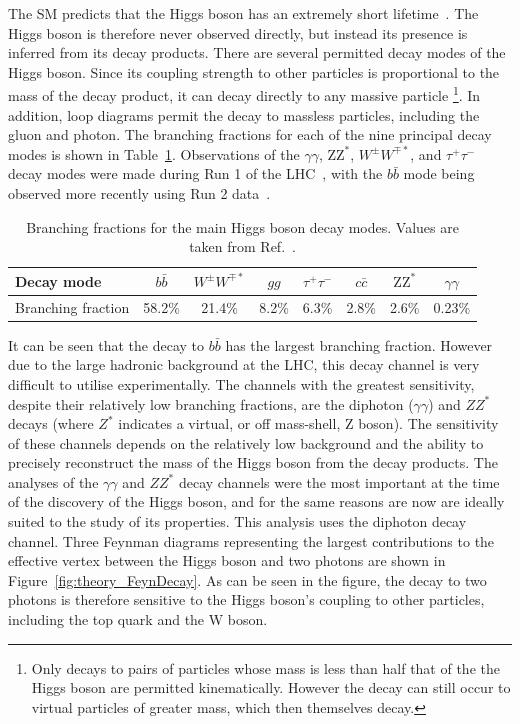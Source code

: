 The SM predicts that the Higgs boson has an extremely short lifetime~\cite{YR4}.
The Higgs boson is therefore never observed directly, 
but instead its presence is inferred from its decay products.
There are several permitted decay modes of the Higgs boson.
Since its coupling strength to other particles is proportional to the mass of the decay product, 
it can decay directly to any massive particle
\footnote{Only decays to pairs of particles whose mass is less than half that of the the Higgs boson
are permitted kinematically. 
However the decay can still occur to virtual particles of greater mass, 
which then themselves decay.}.
In addition, loop diagrams permit the decay to massless particles, including the gluon and photon.
The branching fractions for each of the nine principal decay modes 
is shown in Table~\ref{tab:theory_decay}.
Observations of the $\gamma\gamma$, $\mathrm{ZZ}^{*}$, $W^{\pm}W^{\mp*}$, 
and $\tau^+\tau^-$ decay modes were made during Run 1 
of the LHC~\cite{ATLAScouplingsRun1,CMScouplingsRun1,ATLASandCMScouplingsRun1}, 
with the $b\bar{b}$ mode being observed more recently 
using Run 2 data~\cite{ATLAStautauObservation,CMStautauObservation,ATLASbbObservation,CMSbbObservation}.

\begin{table}
  \centering
  \begin{tabular}{ l | c c c c c c c }
      \hline
      Decay mode & $b\bar{b}$ & $W^{\pm}W^{\mp*}$ & $gg$ & $\tau^+\tau^-$ & $c\bar{c}$ & $\mathrm{ZZ}^{*}$ & $\gamma\gamma$ \\
      \hline
      Branching fraction & 58.2\% & 21.4\% & 8.2\% & 6.3\% & 2.8\% & 2.6\% & 0.23\% \\
      \hline
  \end{tabular}%
  \caption{
  Branching fractions for the main Higgs boson decay modes. 
  Values are taken from Ref.~\cite{YR4}.
  }
  \label{tab:theory_decay}
\end{table}

It can be seen that the decay to $b\bar{b}$ has the largest branching fraction.
However due to the large hadronic background at the LHC, 
this decay channel is very difficult to utilise experimentally.
The channels with the greatest sensitivity, despite their relatively low branching fractions, 
are the diphoton ($\gamma\gamma$) and $ZZ^{*}$ decays 
(where $Z^{*}$ indicates a virtual, or off mass-shell, Z boson).
The sensitivity of these channels depends on the relatively low background 
and the ability to precisely reconstruct the mass of the Higgs boson from the decay products.
The analyses of the $\gamma\gamma$ and $ZZ^{*}$ decay channels were the most important 
at the time of the discovery of the Higgs boson, 
and for the same reasons are now are ideally suited to the study of its properties.
This analysis uses the diphoton decay channel.
Three Feynman diagrams representing the largest contributions to the effective vertex 
between the Higgs boson and two photons are shown in Figure~\ref{fig:theory_FeynDecay}.
As can be seen in the figure, 
the decay to two photons is therefore sensitive to the Higgs boson's coupling to other particles, 
including the top quark and the W boson.

